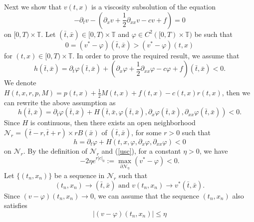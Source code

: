 \documentclass[12pt,a4paper]{ctexart}
\begin{document}
Next we show that $v(t,x)$ is a viscosity subsolution of the equation
\begin{equation*}
    - \partial_{t} v - ( \partial_{x} v + \frac{1}{2} \partial_{xx} v - c v + f) = 0
\end{equation*}
on $[0, T) \times \mathbb{T}$. Let $(\bar t, \bar x) \in [0, T) \times \mathbb{T}$ and $\varphi \in C^{2}([0, T) \times \mathbb{T})$ be such that
\begin{equation} \label{usc}
    0 = (v^{*} - \varphi)(\bar t, \bar x) > (v^{*} - \varphi)(t, x)
\end{equation}
for $(t,x) \in [0, T) \times \mathbb{T}$. In order to prove the required result, we assume that 
\begin{equation*}
    h(\bar t, \bar x) = \partial_{t} \varphi (\bar t, \bar x) + (\partial_{x} \varphi + \frac{1}{2} \partial_{xx} \varphi -  c \varphi + f)(\bar t, \bar x) < 0.
\end{equation*}
We denote $H(t, x, r, p, M) = p(t,x) + \frac{1}{2} M(t,x) + f(t,x) - c(t, x) r (t,x)$, then we can rewrite the above assumption as
\begin{equation*}
    h(\bar t, \bar x) = \partial_{t} \varphi (\bar t, \bar x) + H(\bar t, \bar x, \varphi(\bar t, \bar x), \partial_{x} \varphi(\bar t, \bar x), \partial_{xx} \varphi(\bar t, \bar x)) < 0.
\end{equation*}
Since $H$ is continuous, then there exists an open neighborhood $\mathcal{N}_{r} = (\bar t - r, \bar t + r) \times r B(\bar x)$ of $(\bar t, \bar x)$, for some $r > 0$ such that
\begin{equation*}
    h = \partial_{t} \varphi + H(t, x, \varphi, \partial_{x} \varphi, \partial_{xx} \varphi) < 0  
\end{equation*}
on $\mathcal{N}_{r}$. By the definition of $\mathcal{N}_{r}$ and (\ref{usc}), for a constant $\eta > 0$, we have
\begin{equation} \label{inequality: usc}
    - 2 \eta e^{r |c|_{0}} := \max_{\partial \mathcal{N}_{\eta}} (v^{*} - \varphi) < 0.
\end{equation}
Let $\{(t_n, x_n)\}$ be a sequence in $\mathcal{N}_{r}$ such that
\begin{equation*}
    (t_n, x_n) \to (\bar t, \bar x) \,\, \text{and} \, \, v(t_n, x_n) \to v^{*}(\bar t, \bar x).
\end{equation*}
Since $(v - \varphi)(t_n, x_n) \to 0$, we can assume that the sequence $(t_n, x_n)$ also satisfies
\begin{equation*}
    |(v - \varphi)(t_n, x_n)| \leq \eta 
\end{equation*}
\end{document}
